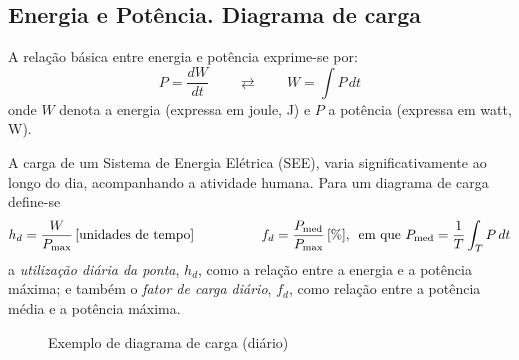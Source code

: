 \subsection{Energia e Potência. Diagrama de carga}
\label{subsec:energy-and-power}

A relação básica entre energia e potência exprime-se por:
$$
    P = \frac{dW}{dt} \qquad\rightleftarrows\qquad W = \int P\, dt
$$
onde $W$ denota a energia (expressa em joule, J) e $P$ a potência (expressa em watt, W).

\vspace{1em}
\noindent A carga de um Sistema de Energia Elétrica (SEE), varia significativamente ao longo do dia, acompanhando a atividade humana. Para um diagrama de carga define-se
$$
    h_d = \frac{W}{P_\text{max}}\, [\text{unidades de tempo}] \qquad\quad\qquad f_d = \frac{P_\text{med}}{P_\text{max}}\, [\%], \mkern9mu \text{em que } P_\text{med} = \frac{1}{T} \int_T P\, dt
$$
a \textit{utilização diária da ponta}, $h_d$, como a relação entre a energia e a potência máxima; e também o \textit{fator de carga diário}, $f_d$, como relação entre a potência média e a potência máxima.

\begin{figure}[H]
    \centering
    \caption{Exemplo de diagrama de carga (diário)}
    \label{fig:diagrama-carga}
\end{figure}

